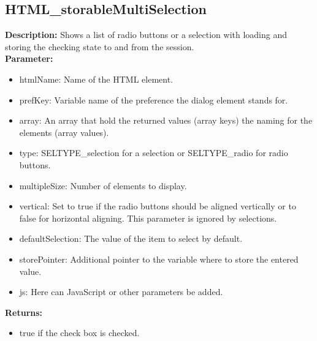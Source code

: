 \subsection{HTML\_storableMultiSelection}
\textbf{Description:} Shows a list of radio buttons or a selection with loading and storing the checking state to and from the session.\\
\textbf{Parameter:}
\begin{itemize}
\item htmlName: Name of the HTML element.
\item prefKey: Variable name of the preference the dialog element stands for.
\item array: An array that hold the returned values (array keys) the naming for the elements (array values).
\item type: SELTYPE\_selection for a selection or SELTYPE\_radio for radio buttons.
\item multipleSize: Number of elements to display.
\item vertical: Set to true if the radio buttons should be aligned vertically or to false for horizontal aligning. This parameter is ignored by selections.
\item defaultSelection: The value of the item to select by default.
\item storePointer: Additional pointer to the variable where to store the entered value.
\item js: Here can JavaScript or other parameters be added.
\end{itemize}
\textbf{Returns:}
\begin{itemize}
\item true if the check box is checked.
\end{itemize}

